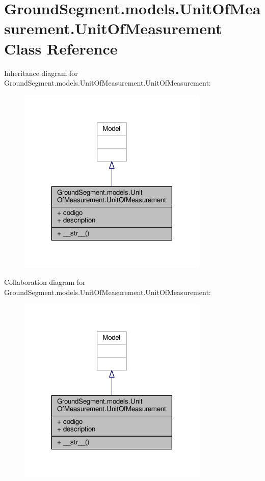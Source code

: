 \hypertarget{class_ground_segment_1_1models_1_1_unit_of_measurement_1_1_unit_of_measurement}{}\section{Ground\+Segment.\+models.\+Unit\+Of\+Measurement.\+Unit\+Of\+Measurement Class Reference}
\label{class_ground_segment_1_1models_1_1_unit_of_measurement_1_1_unit_of_measurement}


Inheritance diagram for Ground\+Segment.\+models.\+Unit\+Of\+Measurement.\+Unit\+Of\+Measurement\+:\nopagebreak
\begin{figure}[H]
\begin{center}
\leavevmode
\includegraphics[width=257pt]{class_ground_segment_1_1models_1_1_unit_of_measurement_1_1_unit_of_measurement__inherit__graph}
\end{center}
\end{figure}


Collaboration diagram for Ground\+Segment.\+models.\+Unit\+Of\+Measurement.\+Unit\+Of\+Measurement\+:\nopagebreak
\begin{figure}[H]
\begin{center}
\leavevmode
\includegraphics[width=257pt]{class_ground_segment_1_1models_1_1_unit_of_measurement_1_1_unit_of_measurement__coll__graph}
\end{center}
\end{figure}
